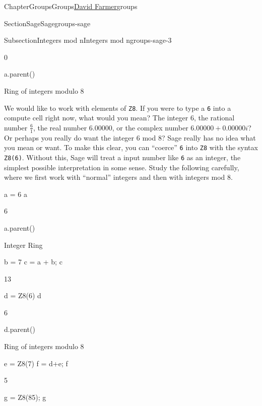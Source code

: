 \documentclass[oneside,10pt,]{book}
\newcommand{\mono}[1]{\texttt{#1}}
\numberwithin{equation}{section}
\begin{document}
\begin{chapterptx}{Chapter}{Groups}{}{Groups}{\hyperlink{dfarmer}{David Farmer}}{}{groups}
\begin{sectionptx}{Section}{Sage}{}{Sage}{}{}{groups-sage}
\begin{subsectionptx}{Subsection}{Integers mod n}{}{Integers mod n}{}{}{groups-sage-3}
\begin{sageoutput}
0
\end{sageoutput}
\begin{sageinput}
a.parent()
\end{sageinput}
\begin{sageoutput}
Ring of integers modulo 8
\end{sageoutput}
We would like to work with elements of \mono{Z8}.  If you were to type a \mono{6} into a compute cell right now, what would you mean?  The integer \(6\), the rational number \(\frac{6}{1}\), the real number \(6.00000\), or the complex number \(6.00000+0.00000i\)?  Or perhaps you really do want the integer \(6\) mod \(8\)?  Sage really has no idea what you mean or want.  To make this clear, you can ``coerce'' \mono{6} into \mono{Z8} with the syntax \mono{Z8(6)}.  Without this, Sage will treat a input number like \mono{6} as an integer, the simplest possible interpretation in some sense.  Study the following carefully, where we first work with ``normal'' integers and then with integers mod 8.%
\begin{sageinput}
a = 6
a
\end{sageinput}
\begin{sageoutput}
6
\end{sageoutput}
\begin{sageinput}
a.parent()
\end{sageinput}
\begin{sageoutput}
Integer Ring
\end{sageoutput}
\begin{sageinput}
b = 7
c = a + b; c
\end{sageinput}
\begin{sageoutput}
13
\end{sageoutput}
\begin{sageinput}
d = Z8(6)
d
\end{sageinput}
\begin{sageoutput}
6
\end{sageoutput}
\begin{sageinput}
d.parent()
\end{sageinput}
\begin{sageoutput}
Ring of integers modulo 8
\end{sageoutput}
\begin{sageinput}
e = Z8(7)
f = d+e; f
\end{sageinput}
\begin{sageoutput}
5
\end{sageoutput}
\begin{sageinput}
g = Z8(85); g

\end{sageinput}
\end{subsectionptx}
\end{sectionptx}
\end{chapterptx}
\end{document}
